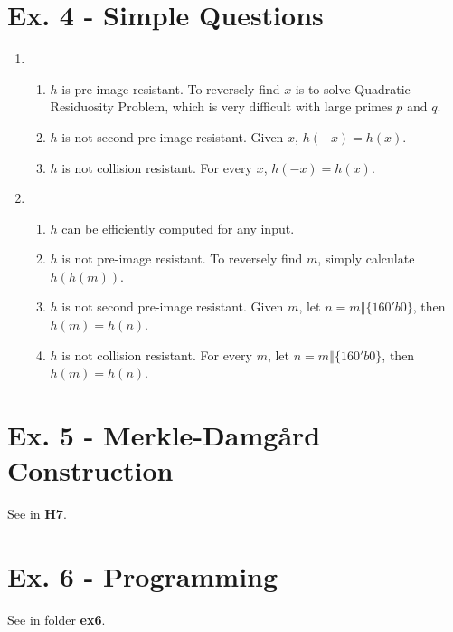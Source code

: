 \documentclass[12pt]{article}
\begin{document}
\section*{Ex. 4 - Simple Questions}

	\begin{enumerate}
		\item
			\begin{enumerate}
				\item $h$ is pre-image resistant. To reversely find $x$ is to solve Quadratic Residuosity Problem, which is very difficult with large primes $p$ and $q$.
				\item $h$ is not second pre-image resistant. Given $x$, $h(-x)=h(x)$.
				\item $h$ is not collision resistant. For every $x$, $h(-x)=h(x)$.
			\end{enumerate}
		\item
			\begin{enumerate}
				\item $h$ can be efficiently computed for any input. 
				\item $h$ is not pre-image resistant. To reversely find $m$, simply calculate $h(h(m))$.
				\item $h$ is not second pre-image resistant. Given $m$, let $n=m\mathbin\Vert\{160'b0\}$, then $h(m)=h(n)$.
				\item $h$ is not collision resistant. For every $m$, let $n=m\mathbin\Vert\{160'b0\}$, then $h(m)=h(n)$.
			\end{enumerate}
	\end{enumerate}

\section*{Ex. 5 - Merkle-Damgård Construction}

	See in \textbf{H7}.

\section*{Ex. 6 - Programming}

	See in folder \textbf{ex6}.
\end{document}
